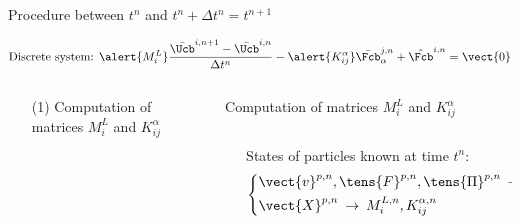 \begin{frame}{Procedure between $t^n$ and $t^n + \Delta t^n=t^{n+1}$}
  \begin{footnotesize}
    \begin{overprint}
      \begin{equation*}
        \text{Discrete system: }\alert{M^L_{i}} \frac{\bar{\Ucb}^{i,n+1} - \bar{\Ucb}^{i,n}}{\Delta t^n}  - \alert{K_{ij}^\alpha} \bar{\Fcb}^{j,n}_{\alpha}  + \hat{\Fcb}^{i,n}=  \vect{0}
      \end{equation*}
      \begin{columns}
        \begin{column}{0.4\textwidth}
          \begin{itemize}
          \item[(1)] Computation of matrices $M_i^L$ and $K_{ij}^\alpha$
          \end{itemize}
        \end{column}
        \vrule{}
        \begin{column}{0.6\textwidth}
          \begin{block}{Computation of matrices $M_i^L$ and $K_{ij}^\alpha$}
            \begin{columns}
              \begin{column}{0.3\textwidth}
                \vskip 0.9pt
              \end{column}
              \begin{column}{0.6\textwidth}
                States of particles known at time $t^n$:
                \begin{equation*}
                  \left\lbrace\begin{aligned}
                      & \vect{v}^{p,n},\tens{F}^{p,n},\tens{\Pi}^{p,n} \: \rightarrow \:\Ucb^{p,n},\Qcb^{p,n}\\
                      & \vect{X}^{p,n} \: \rightarrow \:M_i^{L,n},K_{ij}^{\alpha,n}
                    \end{aligned}\right.
                \end{equation*}
                

\end{column}
\end{columns}
\end{block}
\end{column}
\end{columns}
\end{overprint}
\end{footnotesize}
\end{frame}
